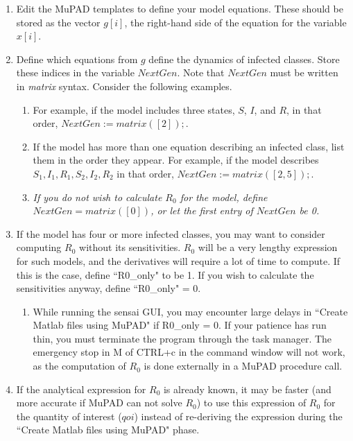 \documentclass[12pt]{article}
\begin{document}
\begin{enumerate}
\item Edit the MuPAD templates to define your model equations.  These should be stored as the vector $g[i]$, the right-hand side of the equation for the variable $x[i]$.

\item Define which equations from $g$ define the dynamics of infected classes.  Store these indices in the variable $NextGen$.  Note that $NextGen$ must be written in \textit{matrix} syntax.  Consider the following examples.
 \begin{enumerate}
  \item For example, if the model includes three states, $S$, $I$, and $R$, in that order, $NextGen := matrix([2]);$.
  \item If the model has more than one equation describing an infected class, list them in the order they appear.  For example, if the model describes $S_1, I_1, R_1, S_2, I_2, R_2$ in that order, $NextGen := matrix([2,5]);$.
  \item \textit{If you do not wish to calculate $R_0$ for the model, define $NextGen = matrix([0])$, or let the first entry of $NextGen$ be 0.}
 \end{enumerate}

\item If the model has four or more infected classes, you may want to consider computing $R_0$ without its sensitivities.  $R_0$ will be a very lengthy expression for such models, and the derivatives will require a lot of time to compute.  If this is the case, define ``R0\_only" to be 1.  If you wish to calculate the sensitivities anyway, define ``R0\_only" = 0.
 \begin{enumerate}
  \item While running the {\sc sensai} GUI, you may encounter large delays in ``Create M{\sc atlab} files using MuPAD" if R0\_only = 0.  If your patience has run thin, you must terminate the program through the task manager.  The emergency stop in M{} of CTRL+c in the command window will not work, as the computation of $R_0$ is done externally in a MuPAD procedure call.
 \end{enumerate}

\item If the analytical expression for $R_0$ is already known, it may be faster (and more accurate if MuPAD can not solve $R_0$) to use this expression of $R_0$ for the quantity of interest ($qoi$) instead of re-deriving the expression during the ``Create M{\sc atlab} files using MuPAD" phase.

\end{enumerate}
\end{document}
